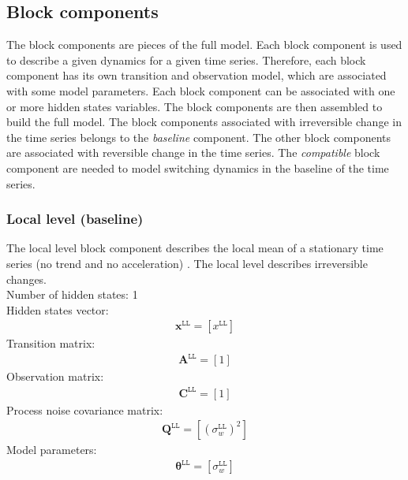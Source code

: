 \subsection{Block components}
\label{SS:BlockComponent}
The block components are pieces of the full model.
Each block component is used to describe a given dynamics for a given time series.
Therefore, each block component has its own transition and observation model, which are associated with some model parameters.
Each block component can be associated with one or more hidden states variables.
The block components are then assembled to build the full model.
The block components associated with irreversible change in the time series belongs to the \emph{baseline} component.
The other block components are associated with reversible change in the time series.
The \emph{compatible} block component are needed to model switching dynamics in the baseline of the time series.

\subsubsection{Local level (baseline)}

The local level block component describes the local mean of a stationary time series (no trend and no acceleration) \cite{STC:STC2035}. 
The local level describes irreversible changes.\\

\noindent
Number of hidden states: 1\\

Hidden states vector: 
\begin{gather*}
\mathbf{x}^{\mathtt{LL}} = [x^{\mathtt{LL}}]
\end{gather*}
Transition matrix: 
\begin{gather*}
\mathbf{A}^{\mathtt{LL}}=[1]
\end{gather*}
Observation matrix: 
\begin{gather*}
\mathbf{C}^{\mathtt{LL}}=[1]
\end{gather*}
Process noise covariance matrix: 
\begin{gather*}
\mathbf{Q}^{\mathtt{LL}}=[(\sigma_{w}^{\mathtt{LL}})^{2}]
\end{gather*}
Model parameters: 
\begin{gather*}
\bm\theta^{\mathtt{LL}}=[\sigma_{w}^{\mathtt{LL}} ]
\end{gather*}

